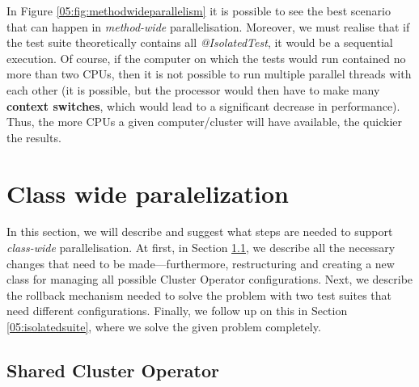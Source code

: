 In Figure \ref {05:fig:methodwideparallelism} it is possible to see the best scenario that can happen in \emph {method-wide} parallelisation.
Moreover, we must realise that if the test suite theoretically contains all \emph{@IsolatedTest}, it would be a sequential execution.
Of course, if the computer on which the tests would run contained no more than two CPUs, then it is not possible to run multiple parallel threads with each other (it is possible, but the processor would then have to make many \textbf{context switches}, which would lead to a significant decrease in performance).
Thus, the more CPUs a given computer/cluster will have available, the quickier the results.

\section{Class wide paralelization}
\label{04:classwideparalelisation}

In this section, we will describe and suggest what steps are needed to support \emph{class-wide} parallelisation.
At first, in Section \ref{05:sharedclusteroperator}, we describe all the necessary changes that need to be made—furthermore, restructuring and creating a new class for managing all possible Cluster Operator configurations.
Next, we describe the rollback mechanism needed to solve the problem with two test suites that need different configurations.
Finally, we follow up on this in Section \ref{05:isolatedsuite}, where we solve the given problem completely.

\subsection{Shared Cluster Operator}
\label{05:sharedclusteroperator}

